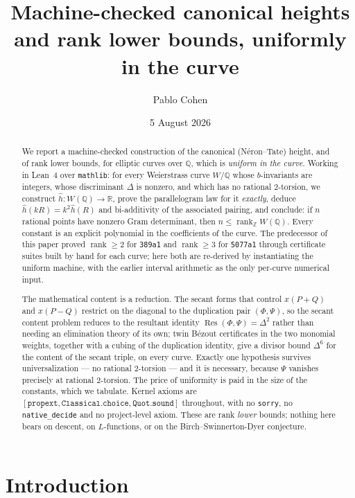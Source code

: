 \documentclass[11pt,reqno]{amsart}
\title[Machine-checked canonical heights and rank lower bounds,
uniformly in the curve]{Machine-checked canonical heights and rank lower
bounds, uniformly in the curve}
\author{Pablo Cohen}
\date{5 August 2026}
\theoremstyle{plain}
\theoremstyle{definition}
\theoremstyle{remark}
\DeclareRobustCommand{\lt}[1]{\texttt{#1}}
\newcommand{\hh}{\widehat{h}}
\DeclareMathOperator{\rank}{rank}
\DeclareMathOperator{\Res}{Res}
\begin{document}
\begin{abstract}
We report a machine-checked construction of the canonical
(N\'eron--Tate) height, and of rank lower bounds, for elliptic curves
over $\mathbb{Q}$, which is \emph{uniform in the curve}. Working in
Lean~4 over \texttt{mathlib}: for every Weierstrass curve $W/\mathbb{Q}$
whose $b$-invariants are integers, whose discriminant $\Delta$ is
nonzero, and which has no rational $2$-torsion, we construct
$\hh \colon W(\mathbb{Q}) \to \mathbb{R}$, prove the parallelogram law
for it \emph{exactly}, deduce $\hh(kR) = k^2\hh(R)$ and bi-additivity of
the associated pairing, and conclude: if $n$ rational points have
nonzero Gram determinant, then $n \le \rank_{\mathbb{Z}}
W(\mathbb{Q})$. Every constant is an explicit polynomial in the
coefficients of the curve. The predecessor of this paper proved
$\rank \ge 2$ for \texttt{389a1} and $\rank \ge 3$ for \texttt{5077a1}
through certificate suites built by hand for each curve; here both are
re-derived by instantiating the uniform machine, with the earlier
interval arithmetic as the only per-curve numerical input.

The mathematical content is a reduction. The secant forms that control
$x(P{+}Q)$ and $x(P{-}Q)$ restrict on the diagonal to the duplication
pair $(\Phi,\Psi)$, so the secant content problem reduces to the
resultant identity $\Res(\Phi,\Psi) = \Delta^2$ rather than needing an
elimination theory of its own; twin B\'ezout certificates in the two
monomial weights, together with a cubing of the duplication identity,
give a divisor bound $\Delta^6$ for the content of the secant triple, on
every curve. Exactly one hypothesis survives universalization --- no
rational $2$-torsion --- and it is necessary, because $\Psi$ vanishes
precisely at rational $2$-torsion. The price of uniformity is paid in
the size of the constants, which we tabulate. Kernel axioms are
$[\mathtt{propext}, \mathtt{Classical.choice}, \mathtt{Quot.sound}]$
throughout, with no \lt{sorry}, no \lt{native\_decide} and no
project-level axiom. These are rank \emph{lower} bounds; nothing here
bears on descent, on $L$-functions, or on the Birch--Swinnerton-Dyer
conjecture.
\end{abstract}

\maketitle

\section{Introduction}
\end{document}
